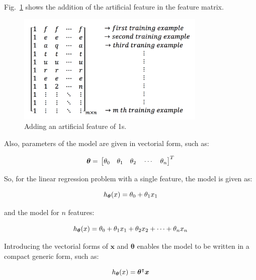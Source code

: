  Fig.~\ref{fig:addArtificialFeature} shows the addition of the artificial feature in the feature matrix.

\begin{figure}
\begin{center}
\includegraphics[width=9cm]{figures/addArtificialFeature}    %
\caption{Adding an artificial feature of 1s.} 
\label{fig:addArtificialFeature}
\end{center}
\end{figure}

Also, parameters of the model are given in vectorial form, such as:

\begin{equation}{\label{eqn:parameterVector}}
\bm{\theta}
=\,
\begin{bmatrix}
\theta_0\quad \theta_1 \quad  \theta_2 \quad \cdots \quad \theta_n 
\end{bmatrix}
^T
\end{equation} 

So, for the linear regression problem with a single feature, the model is given as:

\begin{equation}{\label{eqn:costFuncOneFeature}}
h_{{\bm{\theta}}}(x) = \theta_0 + \theta_1 x_1
\end{equation} 

and the model for $n$ features:

\begin{equation}{\label{eqn:costFuncMltplFeature}}
h_{{\bm{\theta}}}(x) = \theta_0 + \theta_1 x_1 + \theta_2 x_2 + \cdots+ \theta_n x_n
\end{equation}

Introducing the vectorial forms of $\bm{x}$ and $\bm{\theta}$ enables the model to be written in a compact generic form, such as: 

\begin{equation}{\label{eqn:costFuncMltplFeature}}
h_{{\bm{\theta}}}(x) = {\bm{\theta}}^\intercal \bm{x}
\end{equation}

